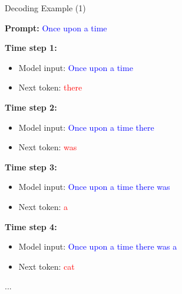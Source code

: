 \begin{frame}{Decoding Example (1)}

{\fontsize{8pt}{10pt}\selectfont
\noindent \textbf{Prompt:} \textcolor{blue}{Once upon a time}

\vspace{0.5cm}

\noindent \textbf{Time step 1:}
\begin{itemize}
    \item Model input: \textcolor{blue}{Once upon a time}
    \item Next token: \textcolor{red}{there}
\end{itemize}

\vspace{0.5cm}

\noindent \textbf{Time step 2:}
\begin{itemize}
    \item Model input: \textcolor{blue}{Once upon a time there}
    \item Next token: \textcolor{red}{was}
\end{itemize}

\vspace{0.5cm}

\noindent \textbf{Time step 3:}
\begin{itemize}
    \item Model input: \textcolor{blue}{Once upon a time there was}
    \item Next token: \textcolor{red}{a}
\end{itemize}

\vspace{0.5cm}

\noindent \textbf{Time step 4:}
\begin{itemize}
    \item Model input: \textcolor{blue}{Once upon a time there was a}
    \item Next token: \textcolor{red}{cat}
\end{itemize}
...
}
\end{frame}


